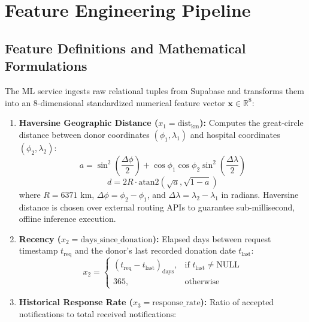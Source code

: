 \documentclass[conference]{IEEEtran}
\begin{document}
\section{Feature Engineering Pipeline}

\subsection{Feature Definitions and Mathematical Formulations}
The ML service ingests raw relational tuples from Supabase and transforms them into an 8-dimensional standardized numerical feature vector $\mathbf{x} \in \mathbb{R}^8$:

\begin{enumerate}
    \item \textbf{Haversine Geographic Distance ($x_1 = \text{dist}_{\text{km}}$):} Computes the great-circle distance between donor coordinates $(\phi_1, \lambda_1)$ and hospital coordinates $(\phi_2, \lambda_2)$:
    \begin{equation}
        a = \sin^2\left(\frac{\Delta\phi}{2}\right) + \cos\phi_1\cos\phi_2\sin^2\left(\frac{\Delta\lambda}{2}\right)
    \end{equation}
    \begin{equation}
        d = 2 R \cdot \text{atan2}\left(\sqrt{a}, \sqrt{1-a}\right)
    \end{equation}
    where $R = 6371\text{ km}$, $\Delta\phi = \phi_2 - \phi_1$, and $\Delta\lambda = \lambda_2 - \lambda_1$ in radians. Haversine distance is chosen over external routing APIs to guarantee sub-millisecond, offline inference execution.
    \item \textbf{Recency ($x_2 = \text{days\_since\_donation}$):} Elapsed days between request timestamp $t_{\text{req}}$ and the donor's last recorded donation date $t_{\text{last}}$:
    \begin{equation}
        x_2 = \begin{cases} (t_{\text{req}} - t_{\text{last}})_{\text{days}}, & \text{if } t_{\text{last}} \neq \text{NULL} \\ 365, & \text{otherwise} \end{cases}
    \end{equation}
    \item \textbf{Historical Response Rate ($x_3 = \text{response\_rate}$):} Ratio of accepted notifications to total received notifications:

\end{enumerate}
\end{document}
